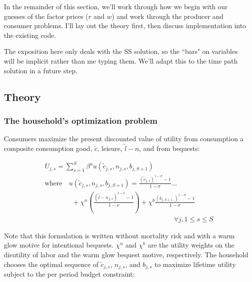 \documentclass[letterpaper,12pt]{article}
\theoremstyle{definition}
\begin{document}
\begin{spacing}{1.5}
In the remainder of this section, we'll work through how we begin with our guesses of the factor prices ($r$ and $w$) and work through the producer and consumer problems.  I'll lay out the theory first, then discuss implementation into the existing code.  

The exposition here only deals with the SS solution, so the ``bars" on variables will be implicit rather than me typing them.  We'll adapt this to the time path solution in a future step.

\subsection*{Theory}

\subsubsection*{The household's optimization problem}

Consumers maximize the present discounted value of utility from consumption a composite consumption good, $\tilde{c}$, leisure, $\tilde{l}-n$, and from bequests:

    \begin{equation}\label{EqUtilMax}
      \begin{split}
        &U_{j,s} = \sum_{s=1}^{S}\beta^u  u\left(\tilde{c}_{j,s},n_{j,s},b_{j,S+1}\right) \\
        &\text{where} \quad u\left(\tilde{c}_{j,s},n_{j,s},b_{j,S+1}\right) = \frac{\left(\tilde{c}_{j,s}\right)^{1-\sigma} - 1}{1-\sigma} ... \\
        &\qquad\qquad + \chi^n\left(\frac{\left(\tilde{l}-n_{j,s}\right)^{1-\nu} - 1}{1-\nu} \right) + \chi^b\frac{\left(b_{j,S+1,}\right)^{1-\sigma} - 1}{1-\sigma} \\
        &\quad\quad\quad\quad\quad\quad\quad\quad\quad\quad\quad\quad\quad\quad\quad\quad\quad\quad\quad\forall j,1\leq s\leq S
      \end{split}
    \end{equation}
    
 Note that this formulation is written without mortality risk and with a warm glow motive for intentional bequests. $\chi^{n}$ and $\chi^{b}$ are the utility weights on the disutility of labor and the warm glow bequest motive, respectively.  The household chooses the optimal sequence of $\tilde{c}_{j,s}$, $n_{j,s}$, and $b_{j,s}$ to maximize lifetime utility subject to the per period budget constraint: 
 

\end{spacing}
\end{document}
